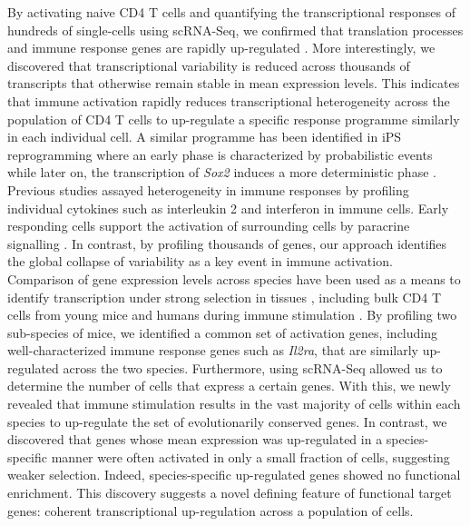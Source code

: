 By activating naive CD4\plus{} T cells and quantifying the transcriptional responses of hundreds of single-cells using scRNA-Seq, we confirmed that translation processes and immune response genes are rapidly up-regulated \citep{Asmal2003, Neme2016, Turner2014, Glass2010, Gerondakis2010, Croft2009}. More interestingly, we discovered that transcriptional variability is reduced across thousands of transcripts that otherwise remain stable in mean expression levels. This indicates that immune activation rapidly reduces transcriptional heterogeneity across the population of CD4\plus{} T cells to up-regulate a specific response programme similarly in each individual cell. A similar programme has been identified in iPS reprogramming where an early phase is characterized by probabilistic events while later on, the transcription of \textit{Sox2} induces a  more deterministic phase \citep{Buganim2012}. Previous studies assayed heterogeneity in immune responses by profiling individual cytokines such as interleukin 2 and interferon \textbeta{} in immune cells. Early responding cells support the activation of surrounding cells by paracrine signalling \citep{Fuhrmann2016, Shalek2014}. In contrast, by profiling thousands of genes, our approach identifies the global collapse of variability as a key event in immune activation.\\

Comparison of gene expression levels across species have been used as a means to identify transcription under strong selection in tissues \citep{Sudmant2015, Brawand2011, Romero2012, Barbosa-Morais2012, Perry2012}, including bulk CD4\plus{} T cells from young mice and humans during immune stimulation \citep{Shay2013}. By profiling two sub-species of mice, we identified a common set of activation genes, including well-characterized immune response genes such as \textit{Il2ra}, that are similarly up-regulated across the two species. Furthermore, using scRNA-Seq allowed us to determine the number of cells that express a certain genes. With this, we newly revealed that immune stimulation results in the vast majority of cells within each species to up-regulate the set of evolutionarily conserved genes. In contrast, we discovered that genes whose mean expression was up-regulated in a species-specific manner were often activated in only a small fraction of cells, suggesting weaker selection. Indeed, species-specific up-regulated genes showed no functional enrichment. This discovery suggests a novel defining feature of functional target genes: coherent transcriptional up-regulation across a population of cells. \\

